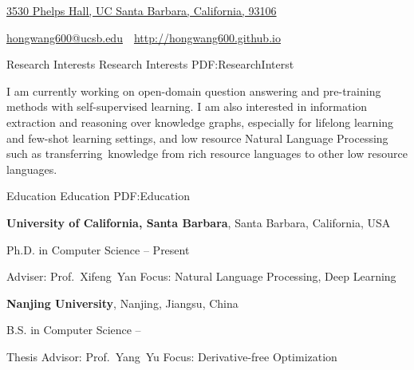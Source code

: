 \documentclass[letterpaper,MMMyyyy,nonstopmode]{simpleresumecv}
\newcommand{\CVAuthor}{Hong Wang}
\newcommand{\CVWebpage}{http://hongwang600.github.io}
\begin{document}

\Title{\CVAuthor}

\begin{SubTitle}
\href{https://www.google.com/maps/place/Phelps+Hall/@34.4161308,-119.8468366,17z/data=!3m1!4b1!4m5!3m4!1s0x80e93f7042b51aa9:0xc80cbd08cacd9e49!8m2!3d34.4161308!4d-119.8446426}
{3530 Phelps Hall, UC Santa Barbara, California, 93106}
\par
\href{mailto:hongwang600@ucsb.edu}
{hongwang600@ucsb.edu}
\,\SubBulletSymbol\,
\href{\CVWebpage}
{\url{\CVWebpage}}
\end{SubTitle}

\begin{Body}


\Section
{Research \newline Interests}
{Research Interests}
{PDF:ResearchInterst}

\Entry
I am currently working on open-domain question answering and pre-training methods with self-supervised learning. I am also interested in information extraction and reasoning over knowledge graphs, especially for lifelong learning and few-shot learning settings, and low resource Natural Language Processing such as transferring knowledge from rich resource languages to other low resource languages.


\Section
{Education}
{Education}
{PDF:Education}

\Entry
\textbf{University of California, Santa Barbara},
Santa Barbara, California, USA

\Gap
\BulletItem
Ph.D. in Computer Science
\hfill
{} -- Present
\begin{Detail}
\SubBulletItem
Adviser:
Prof.~Xifeng~Yan
\SubBulletItem
Focus:
Natural Language Processing, Deep Learning
\end{Detail}

\BigGap
\Entry
\textbf{Nanjing University},
Nanjing, Jiangsu, China

\Gap
\BulletItem
B.S. in Computer Science
\hfill
{} --
\begin{Detail}
\SubBulletItem
Thesis Advisor: Prof.~Yang~Yu
\SubBulletItem
Focus: Derivative-free Optimization
\end{Detail}


\end{Body}
\end{document}

